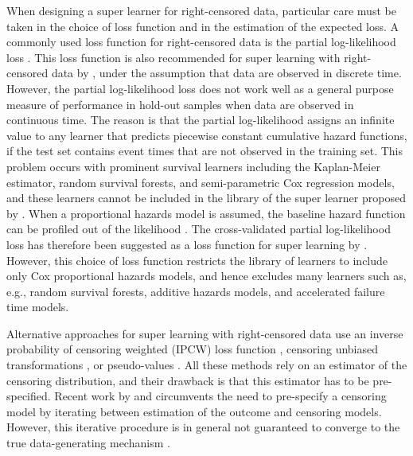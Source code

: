 \documentclass[lineno]{biometrika}
\newcommand{\1}{\mathds{1}}
\begin{document}
When designing a super learner for right-censored data, particular
care must be taken in the choice of loss function and in the
estimation of the expected loss. A commonly used loss function for
right-censored data is the partial log-likelihood loss
\citep[e.g.,][]{li2016regularized,yao2017deep,lee2018deephit,katzman2018deepsurv,gensheimer2019scalable,lee2021boosted,kvamme2021continuous}.
This loss function is also recommended for super learning with
right-censored data by \cite{polley2011-sl-cens}, under the assumption
that data are observed in discrete time. However, the partial
log-likelihood loss does not work well as a general purpose measure of
performance in hold-out samples when data are observed in continuous
time. The reason is that the partial log-likelihood assigns an
infinite value to any learner that predicts piecewise constant
cumulative hazard functions, if the test set contains event times that
are not observed in the training set. This problem occurs with
prominent survival learners including the Kaplan-Meier estimator,
random survival forests, and semi-parametric Cox regression models,
and these learners cannot be included in the library of the super
learner proposed by \cite{polley2011-sl-cens}. When a proportional
hazards model is assumed, the baseline hazard function can be profiled
out of the likelihood \citep{cox1972regression}. The cross-validated
partial log-likelihood loss \citep{verweij1993cross} has therefore
been suggested as a loss function for super learning by
\cite{golmakani2020super}. However, this choice of loss function
restricts the library of learners to include only Cox proportional
hazards models, and hence excludes many learners such as, e.g., random
survival forests, additive hazards models, and accelerated failure
time models.

Alternative approaches for super learning with right-censored data use
an inverse probability of censoring weighted (IPCW) loss function
\citep{graf1999assessment,van2003unicv,molinaro2004tree,keles2004asymptotically,hothorn2006survival,gerds2006consistent,gonzalez2021stacked},
censoring unbiased transformations
\citep{fan1996local,steingrimsson2019censoring}, or pseudo-values
\citep{andersen2003generalised,mogensen2013random,sachs2019ensemble}.
All these methods rely on an estimator of the censoring distribution,
and their drawback is that this estimator has to be pre-specified.
Recent work by \cite{han2021inverse} and \cite{westling2021inference}
circumvents the need to pre-specify a censoring model by iterating
between estimation of the outcome and censoring models. However, this
iterative procedure is in general not guaranteed to converge to the
true data-generating mechanism
\citep[][Appendix~A.4]{munch2024thesis}. 
\end{document}
